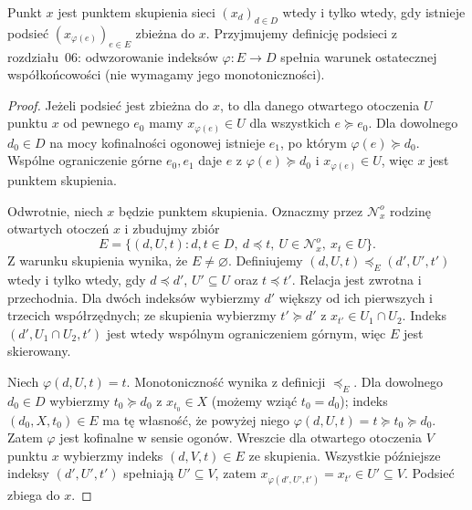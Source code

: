 \begin{stwierdzenie}
\label{prop:topog-zwartosc-podsiec}
Punkt $x$ jest punktem skupienia sieci $(x_d)_{d\in D}$
wtedy i tylko wtedy, gdy istnieje podsieć $(x_{\varphi(e)})_{e\in E}$
zbieżna do $x$. Przyjmujemy definicję podsieci
z rozdziału~06: odwzorowanie indeksów
$\varphi\colon E\to D$ spełnia warunek ostatecznej
współkońcowości (nie wymagamy jego monotoniczności).
\end{stwierdzenie}
\begin{proof}
Jeżeli podsieć jest zbieżna do $x$, to dla danego
otwartego otoczenia $U$ punktu $x$ od pewnego
$e_0$ mamy $x_{\varphi(e)}\in U$ dla wszystkich
$e\succeq e_0$. Dla dowolnego $d_0\in D$
na mocy kofinalności ogonowej istnieje $e_1$,
po którym $\varphi(e)\succeq d_0$.
Wspólne ograniczenie górne $e_0,e_1$ daje
$e$ z $\varphi(e)\succeq d_0$ i
$x_{\varphi(e)}\in U$, więc $x$ jest punktem skupienia.

Odwrotnie, niech $x$ będzie punktem skupienia.
Oznaczmy przez $\mathcal N_x^o$ rodzinę otwartych
otoczeń $x$ i zbudujmy zbiór
\[
E=\{(d,U,t):d,t\in D,\ d\preceq t,\
U\in\mathcal N_x^o,\ x_t\in U\}.
\]
Z warunku skupienia wynika, że $E\ne\varnothing$.
Definiujemy
$(d,U,t)\preceq_E(d',U',t')$ wtedy i tylko wtedy,
gdy $d\preceq d'$, $U'\subseteq U$ oraz $t\preceq t'$.
Relacja jest zwrotna i przechodnia. Dla dwóch
indeksów wybierzmy $d'$ większy od ich pierwszych
i trzecich współrzędnych; ze skupienia wybierzmy
$t'\succeq d'$ z $x_{t'}\in U_1\cap U_2$.
Indeks $(d',U_1\cap U_2,t')$ jest wtedy wspólnym
ograniczeniem górnym, więc $E$ jest skierowany.

Niech $\varphi(d,U,t)=t$. Monotoniczność wynika
z definicji $\preceq_E$. Dla dowolnego $d_0\in D$
wybierzmy $t_0\succeq d_0$ z
$x_{t_0}\in X$ (możemy wziąć $t_0=d_0$);
indeks $(d_0,X,t_0)\in E$ ma tę własność,
że powyżej niego $\varphi(d,U,t)=t\succeq t_0\succeq d_0$.
Zatem $\varphi$ jest kofinalne w sensie ogonów.
Wreszcie dla otwartego otoczenia $V$ punktu $x$
wybierzmy indeks $(d,V,t)\in E$ ze skupienia.
Wszystkie późniejsze indeksy $(d',U',t')$
spełniają $U'\subseteq V$, zatem
$x_{\varphi(d',U',t')}=x_{t'}\in U'\subseteq V$.
Podsieć zbiega do $x$.
\end{proof}

